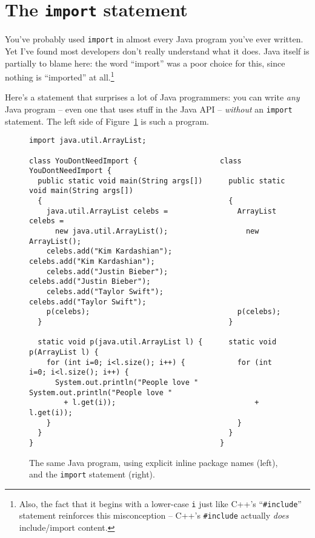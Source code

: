 \section{The \texttt{import} statement}
\label{sec:import}

You've probably used \texttt{import} in almost every Java program you've ever
written. Yet I've found most developers don't really understand what it does.
Java itself is partially to blame here: the word ``import'' was a poor choice
for this, since nothing is ``imported'' at all.\footnote{Also, the fact that
it begins with a lower-case \texttt{i} just like C++'s ``\texttt{\#include}''
statement reinforces this misconception -- C++'s \texttt{\#include} actually
\textit{does} include/import content.}

Here's a statement that surprises a lot of Java programmers: you can write
\textit{any} Java program -- even one that uses stuff in the Java API --
\textit{without} an \texttt{import} statement. The left side of
Figure~\ref{fig:dontNeedImport} is such a program.

\begin{figure}[ht]
\begin{Verbatim}[fontsize=\tiny,samepage=true,frame=single]
                                            import java.util.ArrayList;

class YouDontNeedImport {                   class YouDontNeedImport {                                                 
  public static void main(String args[])      public static void main(String args[])
  {                                           {
    java.util.ArrayList celebs =                ArrayList celebs =
      new java.util.ArrayList();                  new ArrayList();
    celebs.add("Kim Kardashian");               celebs.add("Kim Kardashian");
    celebs.add("Justin Bieber");                celebs.add("Justin Bieber");
    celebs.add("Taylor Swift");                 celebs.add("Taylor Swift");
    p(celebs);                                  p(celebs);
  }                                           }
                                           
  static void p(java.util.ArrayList l) {      static void p(ArrayList l) {
    for (int i=0; i<l.size(); i++) {            for (int i=0; i<l.size(); i++) {
      System.out.println("People love "           System.out.println("People love "
        + l.get(i));                                + l.get(i));
    }                                           }
  }                                           }
}                                           }
\end{Verbatim}
\caption{The same Java program, using explicit inline package names (left),
and the \texttt{import} statement (right).}
\label{fig:dontNeedImport}
\end{figure}


